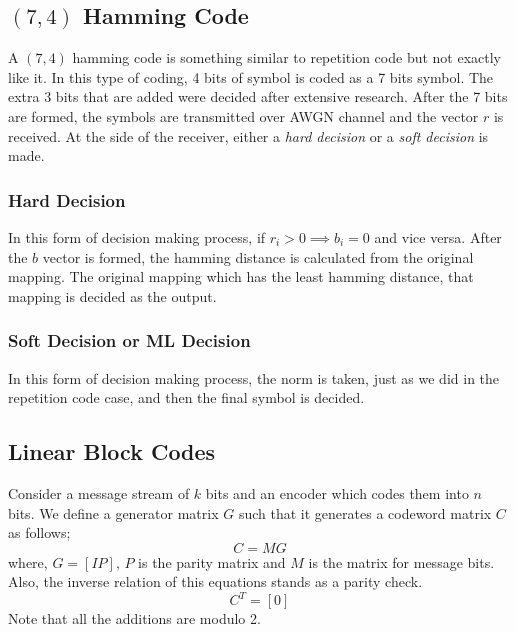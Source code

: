 \documentclass[twocolumn]{report}
\begin{document}
\subsection{$(7, 4)$ Hamming Code}
A $(7, 4)$ hamming code is something similar to repetition code but not exactly like it. In this type of coding, 4 bits of symbol is coded as a 7 bits symbol. The extra 3 bits that are added were decided after extensive research. After the 7 bits are formed, the symbols are transmitted over AWGN channel and the vector $r$ is received. At the side of the receiver, either a \textit{hard decision} or a \textit{soft decision} is made. 
\subsubsection{Hard Decision}
In this form of decision making process, if $r_{i} > 0 \implies b_{i} = 0$ and vice versa. After the $b$ vector is formed, the hamming distance is calculated from the original mapping. The original mapping which has the least hamming distance, that mapping is decided as the output.
\subsubsection{Soft Decision or ML Decision}
In this form of decision making process, the norm is taken, just as we did in the repetition code case, and then the final symbol is decided.

\subsection{Linear Block Codes}
Consider a message stream of $k$ bits and an encoder which codes them into $n$ bits. We define a generator matrix $G$ such that it generates a codeword matrix $C$ as follows;
\begin{equation}
C = MG
\end{equation}
where, $G = [IP]$, $P$ is the parity matrix and $M$ is the matrix for message bits. Also, the inverse relation of this equations stands as a parity check.
\begin{equation}
[P^{T}I]C^{T} = [0]
\end{equation}
Note that all the additions are modulo 2.
\end{document}
